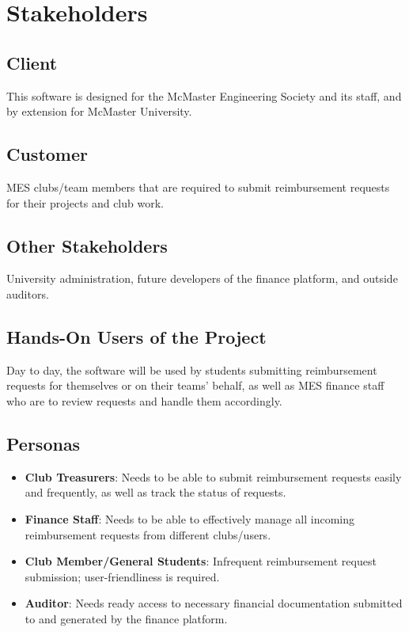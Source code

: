\documentclass[12pt]{article}
\begin{document}
\section{Stakeholders}
\subsection{Client}
This software is designed for the McMaster Engineering Society and its staff, and by extension for McMaster University.

\subsection{Customer}
MES clubs/team members that are required to submit reimbursement requests for their projects and club work.

\subsection{Other Stakeholders}
University administration, future developers of the finance platform, and outside auditors.

\subsection{Hands-On Users of the Project}
Day to day, the software will be used by students submitting reimbursement requests for themselves or on their teams' behalf, as well as MES finance staff who are to review requests and handle them accordingly.

\subsection{Personas}
\begin{itemize}
    \item \textbf{Club Treasurers}: Needs to be able to submit reimbursement requests easily and frequently, as well as track the status of requests.
    \item \textbf{Finance Staff}: Needs to be able to effectively manage all incoming reimbursement requests from different clubs/users.
    \item \textbf{Club Member/General Students}: Infrequent reimbursement request submission; user-friendliness is required.
    \item \textbf{Auditor}: Needs ready access to necessary financial documentation submitted to and generated by the finance platform.
\end{itemize}
\end{document}
